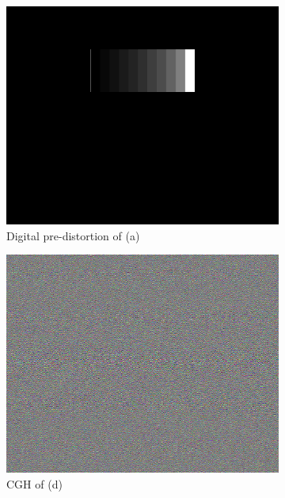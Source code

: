 \begin{figure}[H]
  \begin{subfigure}[t]{0.3\textwidth}
    \includegraphics[width=\textwidth]{10_step_corrected.png}
    \caption{Digital pre-distortion of (a)}\label{fig:10_step_corrected}
  \end{subfigure}
  \hfill
  \begin{subfigure}[t]{0.3\textwidth}
    \includegraphics[width=\textwidth]{Holo_10_step_corrected.png}
    \caption{CGH of (d)}\label{fig:Holo_10_step_corrected}
  \end{subfigure}
  \hfill
  \begin{subfigure}[t]{0.37\textwidth}

\end{subfigure}
\end{figure}
